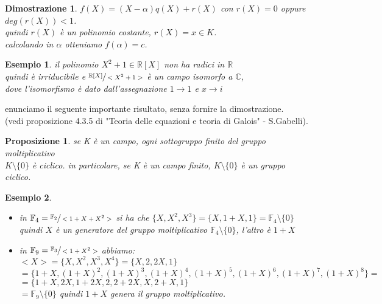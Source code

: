 \documentclass[a4paper,12pt]{article}
\theoremstyle{def}
\theoremstyle{prop}
\newtheorem*{proposition}{Proposizione}
\theoremstyle{esempio}
\newtheorem*{example}{Esempio}
\theoremstyle{dimostrazione}
\newtheorem*{dimostrazione}{Dimostrazione}
\theoremstyle{teo}
\theoremstyle{osservazione}
\begin{document}
\begin{dimostrazione}
	\(f(X) = (X - \alpha) q(X) + r(X)\) con \(r(X) = 0\) oppure \(deg(r(X)) < 1\).\\
	quindi \(r(X)\) è un polinomio costante, \(r(X) = x \in K\).\\
	calcolando in \(\alpha\) otteniamo \(f(\alpha) = c\).\\
\end{dimostrazione}

\begin{example}
	il polinomio \(X^2 + 1 \in \mathbb{R}[X]\) non ha radici in \(\mathbb{R}\)\\
	quindi è irriducibile e \(\sfrac{\mathbb{R}[X]}{<X^2 + 1>}\) è un campo isomorfo a \(\mathbb{C}\),\\
	dove l'isomorfismo è dato dall'assegnazione \(1 \rightarrow 1\) e \(x \rightarrow i\)\\
\end{example}

\newpage

enunciamo il seguente importante risultato, senza fornire la dimostrazione.\\
(vedi proposizione 4.3.5 di "Teoria delle equazioni e teoria di Galois" - S.Gabelli).\\

\begin{proposition}
	se K è un campo, ogni sottogruppo finito del gruppo moltiplicativo\\
	\(K \setminus \{0\}\) è ciclico. in particolare, se K è un campo finito, \(K \setminus \{0\}\) è un gruppo ciclico.
\end{proposition}

\begin{example}
	\begin{itemize}
		\item in \(\mathbb{F}_4 = \sfrac{\mathbb{F}_2}{<1 + X + X^2>}\) si ha che \(\{ X, X^2, X^3\} = \{ X, 1 + X, 1\} = \mathbb{F}_4 \setminus \{0\}\)\\
		      quindi \(X\) è un generatore del gruppo moltiplicativo \(\mathbb{F}_4 \setminus \{0\}\), l'altro è \(1 + X\)\\
		\item in \(\mathbb{F}_9 = \sfrac{\mathbb{F}_3}{<1 + X^2>}\) abbiamo:\\
		      \(<X> = \{X, X^2, X^3, X^4\} = \{X, 2, 2X,1\}\)\\
		      \(<1 + X> = \{1 + X, (1 + X)^2, (1 + X)^3, (1 + X)^4, (1 + X)^5, (1 + X)^6, (1 + X)^7, (1 + X)^8\} =\)\\
		      \(= \{1 + X, 2X, 1 + 2X, 2, 2 + 2X, X, 2 + X, 1 \}\)\\
		      \(= \mathbb{F}_9 \setminus \{0\}\) quindi \(1 + X\) genera il gruppo moltiplicativo.
	\end{itemize}
\end{example}
\end{document}
